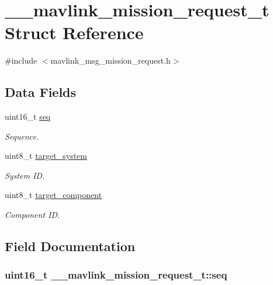 \hypertarget{struct____mavlink__mission__request__t}{\section{\+\_\+\+\_\+mavlink\+\_\+mission\+\_\+request\+\_\+t Struct Reference}
\label{struct____mavlink__mission__request__t}
}


{\ttfamily \#include $<$mavlink\+\_\+msg\+\_\+mission\+\_\+request.\+h$>$}

\subsection*{Data Fields}
\begin{DoxyCompactItemize}
\item 
uint16\+\_\+t \hyperlink{struct____mavlink__mission__request__t_adc8352db8e2a6dd3c5db6ec297e6d7ed}{seq}
\begin{DoxyCompactList}\small\item\em Sequence. \end{DoxyCompactList}\item 
uint8\+\_\+t \hyperlink{struct____mavlink__mission__request__t_a8e2bdf5722c43082dfccd49839f7da43}{target\+\_\+system}
\begin{DoxyCompactList}\small\item\em System I\+D. \end{DoxyCompactList}\item 
uint8\+\_\+t \hyperlink{struct____mavlink__mission__request__t_a3bef9f78c3256322231456b15601f1a6}{target\+\_\+component}
\begin{DoxyCompactList}\small\item\em Component I\+D. \end{DoxyCompactList}\end{DoxyCompactItemize}


\subsection{Field Documentation}
\hypertarget{struct____mavlink__mission__request__t_adc8352db8e2a6dd3c5db6ec297e6d7ed}{
\subsubsection[{seq}]{\setlength{\rightskip}{0pt plus 5cm}uint16\+\_\+t \+\_\+\+\_\+mavlink\+\_\+mission\+\_\+request\+\_\+t\+::seq}}\label{struct____mavlink__mission__request__t_adc8352db8e2a6dd3c5db6ec297e6d7ed}


